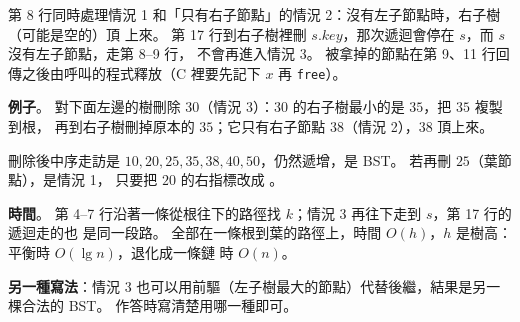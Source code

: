 \begin{pastsoln}
第 8 行同時處理情況 1 和「只有右子節點」的情況 2：沒有左子節點時，右子樹（可能是空的）頂
上來。 第 17 行到右子樹裡刪 $s.\mathit{key}$，那次遞迴會停在 $s$，而 $s$ 沒有左子節點，走第 8--9 行，
不會再進入情況 3。 被拿掉的節點在第 9、11 行回傳之後由呼叫的程式釋放（C 裡要先記下 $x$ 再
\texttt{free}）。

\textbf{例子}。 對下面左邊的樹刪除 $30$（情況 3）：$30$ 的右子樹最小的是 $35$，把 $35$ 複製到根，
再到右子樹刪掉原本的 $35$；它只有右子節點 $38$（情況 2），$38$ 頂上來。
\begin{center}
\end{center}
刪除後中序走訪是 $10, 20, 25, 35, 38, 40, 50$，仍然遞增，是 BST。 若再刪 $25$（葉節點），是情況 1，
只要把 $20$ 的右指標改成 \NIL。

\textbf{時間}。 第 4--7 行沿著一條從根往下的路徑找 $k$；情況 3 再往下走到 $s$，第 17 行的遞迴走的也
是同一段路。 全部在一條根到葉的路徑上，時間 $O(h)$，$h$ 是樹高：平衡時 $O(\lg n)$，退化成一條鏈
時 $O(n)$。

\textbf{另一種寫法}：情況 3 也可以用前驅（左子樹最大的節點）代替後繼，結果是另一棵合法的 BST。
作答時寫清楚用哪一種即可。
\end{pastsoln}

